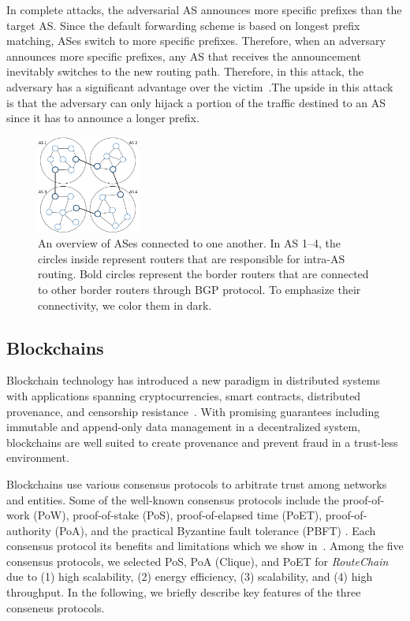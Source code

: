 \documentclass[5p]{elsarticle}
\newcommand{\rc}{{{\em RouteChain}}\xspace}
\begin{document}
In complete attacks, the adversarial AS announces more specific prefixes than the target AS. Since the default forwarding scheme is based on longest prefix matching, ASes switch to more specific prefixes. Therefore, when an adversary announces more specific prefixes, any AS that receives the announcement inevitably switches to the new routing path. Therefore, in this attack, the adversary has a significant advantage over the victim~\cite{BGPHijack}.The upside in this attack is that the adversary can only hijack a portion of the traffic destined to an AS since it has to announce a longer prefix.

\begin{figure}[t]
\begin{center}
\includegraphics[width=0.30\textwidth]{fig/ASes.pdf}
\caption{An overview of ASes connected to one another. In AS 1--4, the circles inside represent routers that are responsible for intra-AS routing. Bold circles represent the border routers that are connected to other border routers through BGP protocol. To emphasize their connectivity, we color them in dark.  } 
\label{fig:ASes}
\end{center}

\end{figure}


\subsection{Blockchains} \label{sec:BC}
Blockchain technology has introduced a new paradigm in distributed systems with applications spanning cryptocurrencies, smart contracts, distributed provenance, and censorship resistance~\cite{NeisseSN17,Omohundro14,GovernatoriIMRS18,AhmadSBM18}. With promising guarantees including immutable and append-only data management in a decentralized system, blockchains are well suited to create provenance and prevent fraud in a trust-less environment. 

Blockchains use various consensus protocols to arbitrate trust among networks and entities. Some of the well-known consensus protocols include the proof-of-work (PoW), proof-of-stake (PoS), proof-of-elapsed time (PoET), proof-of-authority (PoA), and the practical Byzantine fault tolerance (PBFT) \cite{SaadM18,SaadNKM18}. Each consensus protocol its benefits and limitations which we show in~\cite{tab:ca}. Among the five consensus protocols, we selected PoS, PoA (Clique), and PoET for \rc due to (1) high scalability, (2) energy efficiency, (3) scalability, and (4) high throughput.  In the following, we briefly describe key features of the three conseneus protocols.  
\end{document}
